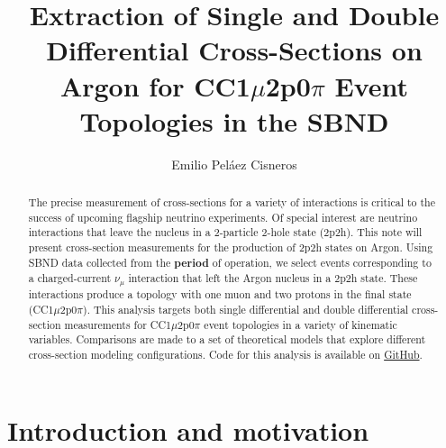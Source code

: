 \documentclass{article}
\title{Extraction of Single and Double Differential Cross-Sections on Argon for CC1$\mu$2p0$\pi$ Event Topologies in the SBND}
\author{Emilio Peláez Cisneros}
\begin{document}
\maketitle

\begin{abstract}
    The precise measurement of cross-sections for a variety of interactions is critical to the success of upcoming
    flagship neutrino experiments. Of special interest are neutrino interactions that leave the nucleus in a 
    2-particle 2-hole state (2p2h). This note will present cross-section measurements for the production of 2p2h
    states on Argon. Using SBND data collected from the \textbf{period} of operation, we select events corresponding 
    to a charged-current $\nu_\mu$ interaction that left the Argon nucleus in a 2p2h state. These interactions produce
    a topology with one muon and two protons in the final state (CC1$\mu$2p0$\pi$). This analysis targets both single 
    differential and double differential cross-section measurements for CC1$\mu$2p0$\pi$ event topologies in a variety of
    kinematic variables. Comparisons are made to a set of theoretical models that explore different cross-section
    modeling configurations. Code for this analysis is available on \href{https://github.com/epelaaez/CC1muAnalysis/tree/main}{GitHub}.
\end{abstract}

\tableofcontents
\newpage

\linenumbers

\section{Introduction and motivation}
\end{document}
